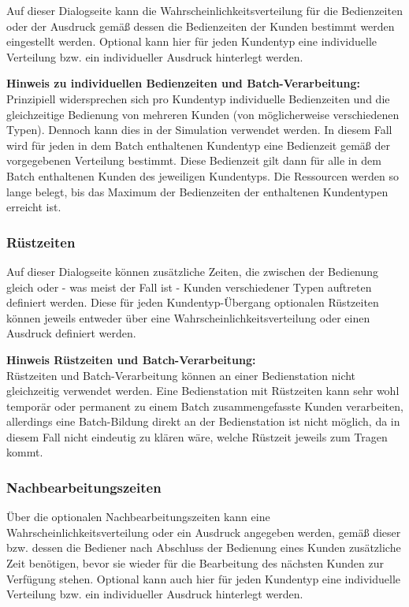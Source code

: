 Auf dieser Dialogseite kann die Wahrscheinlichkeitsverteilung für die Bedienzeiten oder der Ausdruck gemäß
dessen die Bedienzeiten der Kunden bestimmt werden eingestellt werden. Optional
kann hier für jeden Kundentyp eine individuelle Verteilung bzw. ein individueller Ausdruck hinterlegt werden.

\textbf{Hinweis zu individuellen Bedienzeiten und Batch-Verarbeitung:}~\\
Prinzipiell widersprechen sich pro Kundentyp individuelle Bedienzeiten und die gleichzeitige Bedienung von mehreren Kunden
(von möglicherweise verschiedenen Typen). Dennoch kann dies in der Simulation verwendet werden. In diesem Fall wird für jeden
in dem Batch enthaltenen Kundentyp eine Bedienzeit gemäß der vorgegebenen Verteilung bestimmt. Diese Bedienzeit gilt dann
für alle in dem Batch enthaltenen Kunden des jeweiligen Kundentyps. Die Ressourcen werden so lange belegt, bis das
Maximum der Bedienzeiten der enthaltenen Kundentypen erreicht ist.

\subsubsection*{Rüstzeiten}

Auf dieser Dialogseite können zusätzliche Zeiten, die zwischen der Bedienung gleich oder - was meist der Fall ist -
Kunden verschiedener Typen auftreten definiert werden. Diese für jeden Kundentyp-Übergang optionalen Rüstzeiten
können jeweils entweder über eine Wahrscheinlichkeitsverteilung oder einen Ausdruck definiert werden.

\textbf{Hinweis Rüstzeiten und Batch-Verarbeitung:}~\\
Rüstzeiten und Batch-Verarbeitung können an einer Bedienstation nicht gleichzeitig
verwendet werden. Eine Bedienstation mit Rüstzeiten kann sehr wohl temporär oder permanent
zu einem Batch zusammengefasste Kunden verarbeiten, allerdings eine Batch-Bildung direkt an
der Bedienstation ist nicht möglich, da in diesem Fall nicht eindeutig zu klären wäre,
welche Rüstzeit jeweils zum Tragen kommt.

\subsubsection*{Nachbearbeitungszeiten}

Über die optionalen Nachbearbeitungszeiten kann eine Wahrscheinlichkeitsverteilung oder ein Ausdruck angegeben werden, gemäß
dieser bzw. dessen die Bediener nach Abschluss der Bedienung eines Kunden zusätzliche Zeit benötigen, bevor sie wieder für
die Bearbeitung des nächsten Kunden zur Verfügung stehen. Optional kann auch hier für jeden Kundentyp eine individuelle Verteilung
bzw. ein individueller Ausdruck hinterlegt werden.

